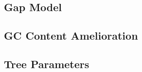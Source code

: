 \documentclass[11pt]{article}
\begin{document}
\subsection{Gap Model}

\subsection{GC Content Amelioration}
%

\subsection{Tree Parameters}
%
%
%
\end{document}
